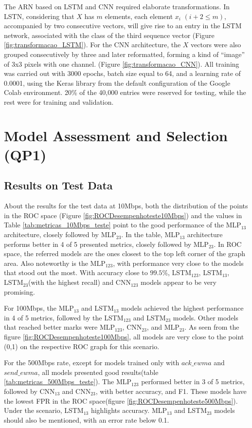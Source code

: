 \documentclass[a4paper,fleqn]{cas-sc}
\begin{document}
The ARN based on LSTM and CNN required elaborate transformations. In LSTN, considering that $X$ has $m$ elements, each element $x_i$ $(i+2\leq m)$, accompanied by two consecutive vectors, will give rise to an entry in the LSTM network, associated with the class of the third sequence vector (Figure \ref{fig:transformacao_LSTM}). For the CNN architecture, the $X$ vectors were also grouped consecutively by three and later reformatted, forming a kind of ``image'' of 3x3 pixels with one channel.  (Figure \ref{fig:transformacao_CNN}). All training was carried out with 3000 epochs, batch size equal to 64, and a learning rate of 0.0001, using the Keras library from the default configuration of the Google Colab environment. 20\% of the 40,000 entries were reserved for testing, while the rest were for training and validation.

\section{Model Assessment and Selection (QP1)} 

\subsection{Results on Test Data}\label{sec:analysis_training}
About the results for the test data at 10Mbps, both the distribution of the points in the ROC space 
(Figure \ref{fig:ROCDesempenhoteste10Mbps}) and the values in Table \ref{tab:metricas_10Mbps_teste} point to the good performance of the MLP$_{13}$ architecture, closely followed by MLP$_{23}$. In the table, MLP$_{13}$ architecture performs better in 4 of 5 presented metrics, closely followed by MLP$_{23}$. In ROC space, the referred models are the ones closest to the top left corner of the graph area. Also noteworthy is the MLP$_{123}$, with performance very close to the models that stood out the most. With accuracy close to $99.5\%$, LSTM$_{123}$, LSTM$_{13}$, LSTM$_{23}$(with the highest recall) and CNN$_{123}$ models appear to be very promising.

For 100Mbps, the MLP$_{13}$ and LSTM$_{13}$ models achieved the highest performance in 4 of 5 metrics, followed by the LSTM$_{123}$ and LSTM$_{23}$ models. Other models that reached better marks were MLP$_{123}$, CNN$_{23}$, and MLP$_{23}$. As seen from the figure \ref{fig:ROCDesempenhoteste100Mbps}, all models are very close to the point (0,1) on the respective ROC graph for this scenario.

For the 500Mbps rate, except for models trained only with $ack\_ewma$ and $send\_ewma$, all models presented good results(table \ref{tab:metricas_500Mbps_teste}). The MLP$_{123}$ performed better in 3 of 5 metrics, followed by CNN$_{13}$ and CNN$_{23}$, with better accuracy, and F1. These models have the lowest FPR in the ROC space(figure \ref{fig:ROCDesempenhoteste500Mbps}). Under the scenario, LSTM$_{13}$ highlights accuracy. MLP$_{13}$ and LSTM$_{23}$ models should also be mentioned, with an error rate below 0.1.
\end{document}
